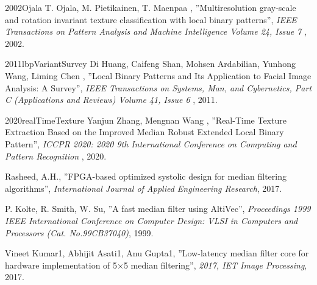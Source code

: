 \documentclass[a4paper,12pt,oneside]{book}%
\begin{document}
\begin{thebibliography}{xx}
	{2002}{Ojala}
	T. Ojala, M. Pietikainen, T. Maenpaa
	, ''Multiresolution gray-scale and rotation invariant texture classification with local binary patterns'', {\em  IEEE Transactions on Pattern Analysis and Machine Intelligence Volume 24, Issue 7 }, 2002.
	
	
	{2011}{lbpVariantSurvey}
	Di Huang, Caifeng Shan, Mohsen Ardabilian, Yunhong Wang, Liming Chen
	, ''Local Binary Patterns and Its Application to Facial Image Analysis: A Survey'', {\em  IEEE Transactions on Systems, Man, and Cybernetics, Part C (Applications and Reviews) Volume 41, Issue 6 }, 2011.
	
	
	{2020}{realTimeTexture}
	Yanjun Zhang, Mengnan Wang
	, ''Real-Time Texture Extraction Based on the Improved Median Robust Extended Local Binary Pattern'', {\em  ICCPR 2020: 2020 9th International Conference on Computing and Pattern Recognition }, 2020.
	
	 	
	Rasheed, A.H., ''FPGA-based optimized systolic design for median filtering algorithms'', {\em International Journal of Applied Engineering Research}, 2017.
	
	P. Kolte, R. Smith,  W. Su, ''A fast median filter using AltiVec'', {\em  Proceedings 1999 IEEE International Conference on Computer Design: VLSI in Computers and Processors (Cat. No.99CB37040)}, 1999.
	
	Vineet Kumar1, Abhijit Asati1, Anu Gupta1, ''Low-latency median filter core for hardware implementation of 5×5 median filtering'', {\em  2017, IET Image Processing}, 2017.
	
	
\end{thebibliography}
\end{document}
